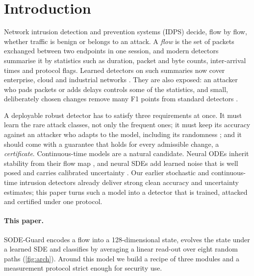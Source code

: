 \section{Introduction}\label{sec:intro}
Network intrusion detection and prevention systems (IDPS) decide, flow by flow,
whether traffic is benign or belongs to an attack. A \emph{flow} is the set of
packets exchanged between two endpoints in one session, and modern detectors
summarise it by statistics such as duration, packet and byte counts,
inter-arrival times and protocol flags. Learned detectors on such summaries now
cover enterprise, cloud and industrial networks
\citep{lo2022egraphsage,wu2022rtids,anaedevha2026mstgnn}.
They are also exposed: an attacker who pads packets or adds delays controls
some of the statistics, and small, deliberately chosen changes remove many F1
points from standard detectors \citep{ennaji2024advsurvey,vitorino2024advbench,anaedevha2024robust}.

A deployable robust detector has to satisfy three requirements at once. It must
learn the rare attack classes, not only the frequent ones; it must keep its
accuracy against an attacker who adapts to the model, including its
randomness \citep{athalye2018obfuscated,carlini2019evaluating}; and it should
come with a guarantee that holds for every admissible change, a
\emph{certificate}. Continuous-time models are a natural candidate. Neural ODEs
inherit stability from their flow map \citep{kang2021sodef}, and neural SDEs
\citep{tzen2019nsde,li2020scalable} add learned noise that is well posed and
carries calibrated uncertainty \citep{oh2024stablesde,liu2020sdenoise}.
Our earlier stochastic and continuous-time intrusion detectors
\citep{anaedevha2026ode,anaedevha2026mstgnn,anaedevha2026fokker,anaedevha2025stochtx} already deliver
strong clean accuracy and uncertainty estimates; this paper turns such a model
into a detector that is trained, attacked and certified under one protocol.

\paragraph{This paper.} SODE-Guard encodes a flow into a 128-dimensional state,
evolves the state under a learned SDE and classifies by averaging a linear
read-out over eight random paths (\cref{fig:arch}). Around this model we build
a recipe of three modules and a measurement protocol strict enough for
security use.

